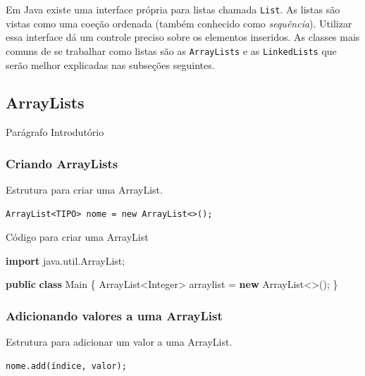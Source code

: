 \documentclass[
]{book}
\newenvironment{Shaded}{\begin{snugshade}}{\end{snugshade}}
\newcommand{\BuiltInTok}[1]{#1}
\newcommand{\ImportTok}[1]{#1}
\newcommand{\KeywordTok}[1]{\textcolor[rgb]{0.13,0.29,0.53}{\textbf{#1}}}
\newcommand{\NormalTok}[1]{#1}
\begin{document}
Em Java existe uma interface própria para listas chamada \texttt{List}. As listas são vistas como uma coeção ordenada (também conhecido como \emph{sequência}). Utilizar essa interface dá um controle preciso sobre os elementos inseridos. As classes mais comuns de se trabalhar como listas são as \texttt{ArrayLists} e as \texttt{LinkedLists} que serão melhor explicadas nas subseções seguintes.

\hypertarget{arraylists}{%
\subsection{ArrayLists}\label{arraylists}}

Parágrafo Introdutório

\hypertarget{criando-arraylists}{%
\subsubsection*{Criando ArrayLists}\label{criando-arraylists}}

Estrutura para criar uma ArrayList.

\begin{verbatim}
ArrayList<TIPO> nome = new ArrayList<>();
\end{verbatim}

Código para criar uma ArrayList

\begin{Shaded}
\begin{Highlighting}[]
\KeywordTok{import}\ImportTok{ java.util.ArrayList;}

\KeywordTok{public} \KeywordTok{class}\NormalTok{ Main \{}
    \BuiltInTok{ArrayList}\NormalTok{<}\BuiltInTok{Integer}\NormalTok{> arraylist = }\KeywordTok{new} \BuiltInTok{ArrayList}\NormalTok{<>();}
\NormalTok{\}}
\end{Highlighting}
\end{Shaded}

\hypertarget{adicionando-valores-a-uma-arraylist}{%
\subsubsection*{Adicionando valores a uma ArrayList}\label{adicionando-valores-a-uma-arraylist}}

Estrutura para adicionar um valor a uma ArrayList.

\begin{verbatim}
nome.add(índice, valor);
\end{verbatim}
\end{document}

